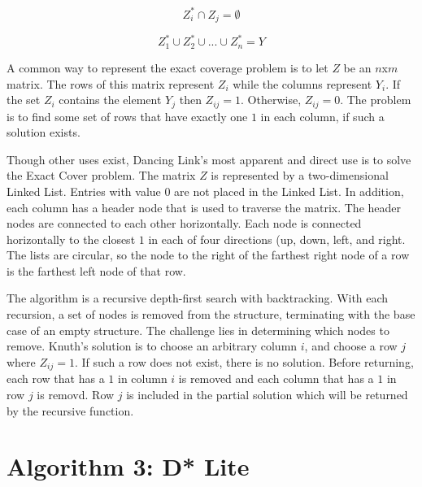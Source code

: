 \documentclass[11pt]{article}
\begin{document}
$$Z_{i}^{\ast} \cap Z_{j} = \emptyset $$

$$Z_{1}^{\ast} \cup Z_{2}^{\ast} \cup ... \cup Z_{n}^{\ast} = Y$$

A common way to represent the exact coverage problem is to let $Z$ be an $n$x$m$ matrix. The rows of  this matrix represent $Z_i$ while the columns represent $Y_i$. If the set $Z_i$ contains the element $Y_j$ then $Z_{ij}=1$. Otherwise, $Z_{ij}=0$. The problem is to find some set of rows that have exactly one $1$ in each column, if such a solution exists.

Though other uses exist, Dancing Link's most apparent and direct use is to solve the Exact Cover problem. The matrix $Z$ is represented by a two-dimensional Linked List. Entries with value $0$ are not placed in the Linked List. In addition, each column has a header node that is used to traverse the matrix. The header nodes are connected to each other horizontally. Each node is connected horizontally to the closest $1$ in each of four directions (up, down, left, and right. The lists are circular, so the node to the right of the farthest right node of a row is the farthest left node of that row.

The algorithm is a recursive depth-first search with backtracking. With each recursion, a set of nodes is removed from the structure, terminating with the base case of an empty structure. The challenge lies in determining which nodes to remove. Knuth's solution is to choose an arbitrary column $i$, and choose a row $j$ where $Z_{ij}=1$. If such a row does not exist, there is no solution. Before returning, each row that has a $1$ in column $i$ is removed and each column that has a $1$ in row $j$ is removd. Row $j$ is included in the partial solution which will be returned by the recursive function.

\section*{Algorithm 3: D* Lite}
\end{document}

